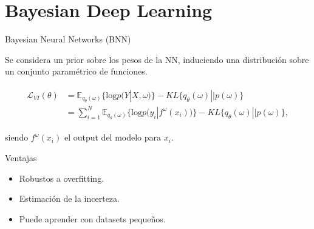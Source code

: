 
\section{Bayesian Deep Learning}


\begin{frame}{Bayesian Neural Networks (BNN)}
    
    Se considera un prior sobre los pesos de la NN, induciendo una distribución sobre un conjunto paramétrico de funciones.
    
    
    \begin{align}
        \begin{split}
            \mathcal{L}_{VI}(\theta) &= \mathbb{E}_{q_\theta(\omega)}\{\text{log} p(Y|X,\omega)\} - KL\{q_\theta(\omega)|| p(\omega)\} \\
            &= \sum_{i=1}^N \mathbb{E}_{q_\theta(\omega)}\{\text{log} p(y_i|f^\omega(x_i))\} - KL\{q_\theta(\omega)|| p(\omega)\},
        \end{split}
    \end{align}

    siendo $f^\omega(x_i)$ el output del modelo para $x_i$.
    
    
    \begin{exampleblock}{Ventajas}
        \begin{itemize}
            \item Robustos a overfitting.
            \item Estimación de la incerteza.
            \item Puede aprender con datasets pequeños.
        \end{itemize}
    \end{exampleblock}
\end{frame}


